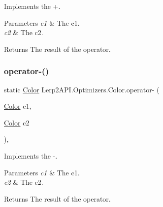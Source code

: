 Implements the +. 


\begin{DoxyParams}{Parameters}
{\em c1} & The c1.\\
\hline
{\em c2} & The c2.\\
\hline
\end{DoxyParams}
\begin{DoxyReturn}{Returns}
The result of the operator.
\end{DoxyReturn}
\mbox{\label{struct_lerp2_a_p_i_1_1_optimizers_1_1_color_af77126d81506d4210e1043ab8a2ff7b2}} 
\subsubsection{\texorpdfstring{operator-\/()}{operator-()}}
{\footnotesize\ttfamily static \hyperlink{struct_lerp2_a_p_i_1_1_optimizers_1_1_color}{Color} Lerp2\+A\+P\+I.\+Optimizers.\+Color.\+operator-\/ (\begin{DoxyParamCaption}\item[{\hyperlink{struct_lerp2_a_p_i_1_1_optimizers_1_1_color}{Color}}]{c1,  }\item[{\hyperlink{struct_lerp2_a_p_i_1_1_optimizers_1_1_color}{Color}}]{c2 }\end{DoxyParamCaption})\hspace{0.3cm}{\ttfamily [inline]}, {\ttfamily [static]}}



Implements the -\/. 


\begin{DoxyParams}{Parameters}
{\em c1} & The c1.\\
\hline
{\em c2} & The c2.\\
\hline
\end{DoxyParams}
\begin{DoxyReturn}{Returns}
The result of the operator.
\end{DoxyReturn}
\mbox{\label{struct_lerp2_a_p_i_1_1_optimizers_1_1_color_a5448b70a7c00c697434c6352b22dffd6}} 
